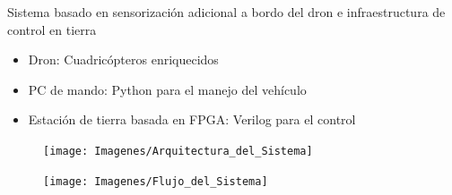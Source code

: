 \documentclass[a4,landscpae]{seminar}
\begin{document}
\begin{hslide}
Sistema basado en sensorizaci\'on adicional a bordo del dron e infraestructura de control en tierra\\

\begin{minipage}{4.5cm}
	\begin{itemize}
		\item Dron: Cuadric\'opteros enriquecidos
	\end{itemize}
	\begin{itemize}
		\item PC de mando: Python para el manejo del veh\'iculo
		\item Estaci\'on de tierra basada en FPGA: Verilog para el control
	\end{itemize}
\end{minipage} \hfill
\begin{minipage}{6cm}
	\begin{figure}
		\texttt{[image: Imagenes/Arquitectura\_del\_Sistema]}
	\end{figure}
\end{minipage} \hfill
\end{hslide}
\begin{hslide}
\begin{center}
	\begin{figure}[h]
		\texttt{[image: Imagenes/Flujo\_del\_Sistema]}
	\end{figure}
\end{center}
\end{hslide}
\end{document}
